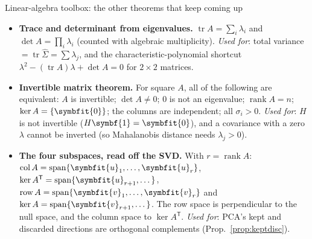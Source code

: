 \documentclass[11pt]{article}
\newcommand{\bm}[1]{\symbfit{#1}}
\newcounter{keyfact}
\newcommand{\one}{\symbf{1}}
\newcommand{\Sig}{\widehat{\Sigma}}
\newcommand{\T}{^{\mathsf T}}
\newcommand{\tr}{\operatorname{tr}}
\newcommand{\rank}{\operatorname{rank}}
\newcommand{\spn}{\operatorname{span}}
\newcommand{\col}{\operatorname{col}}
\begin{document}
\begin{keyfactbox}{Linear-algebra toolbox: the other theorems that keep coming up}
\begin{itemize}[leftmargin=1.3em]
\item \textbf{Trace and determinant from eigenvalues.} $\tr A=\sum_i\lambda_i$ and $\det A=\prod_i\lambda_i$ (counted with algebraic
multiplicity). \emph{Used for}: total variance $=\tr\Sig=\sum\lambda_j$, and the characteristic-polynomial shortcut
$\lambda^2-(\tr A)\lambda+\det A=0$ for $2\times2$ matrices.
\item \textbf{Invertible matrix theorem.} For square $A$, all of the following are equivalent: $A$ is invertible; $\det A\ne0$;
$0$ is not an eigenvalue; $\rank A=n$; $\ker A=\{\bm0\}$; the columns are independent; all $\sigma_i>0$. \emph{Used for}: $H$
is not invertible ($H\one=\bm0$), and a covariance with a zero $\lambda$ cannot be inverted (so Mahalanobis distance
needs $\lambda_j>0$).
\item \textbf{The four subspaces, read off the SVD.} With $r=\rank A$:
$\col A=\spn\{\bm u_1,\dots,\bm u_r\}$, $\ker A\T=\spn\{\bm u_{r+1},\dots\}$, $\operatorname{row}A=\spn\{\bm v_1,\dots,\bm v_r\}$ and
$\ker A=\spn\{\bm v_{r+1},\dots\}$. The row space is perpendicular to the null space, and the column space to $\ker A\T$.
\emph{Used for}: PCA's kept and discarded directions are orthogonal complements (Prop.~\ref{prop:keptdisc}).
\end{itemize}
\end{keyfactbox}
\end{document}
